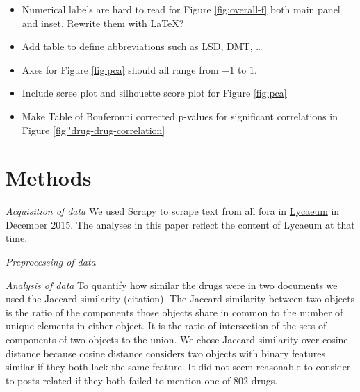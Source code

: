 \documentclass{article}
\begin{document}
 \graphicspath{{imgs/}} 
 
 
 {\color{red}
   \begin{itemize}
   	\item Numerical labels are hard to read for Figure \ref{fig:overall-f} both main panel and inset. Rewrite them with LaTeX?
   	\item Add table to define abbreviations such as LSD, DMT, \ldots
   	\item Axes for Figure \ref{fig:pca} should all range from $-1$ to $1$. 
   	\item Include scree plot and silhouette score plot for Figure \ref{fig:pca}
   	\item Make Table of Bonferonni corrected p-values for significant correlations in Figure \ref{fig''drug-drug-correlation}
   \end{itemize}
 }
 
\section*{Methods}

 \emph{Acquisition of data}
 	We used Scrapy \cite{myers2015} to scrape text from all fora in \href{http://www.lycaeum.org}{Lycaeum} in December $2015$. The analyses in this paper reflect the content of Lycaeum at that time. 
 
\emph{Preprocessing of data}	
 	
\emph{Analysis of data} To quantify how similar the drugs were in two documents we used the Jaccard similarity (citation). The Jaccard similarity between two objects is the ratio of the components those objects share in common to the number of unique elements in either object. It is the ratio of intersection of the sets of components of two objects to the union. We chose Jaccard similarity over cosine distance because cosine distance considers two objects with binary features similar if they both lack the same feature. It did not seem reasonable to consider to posts related if they both failed to mention one of $802$ drugs. 
\end{document}
